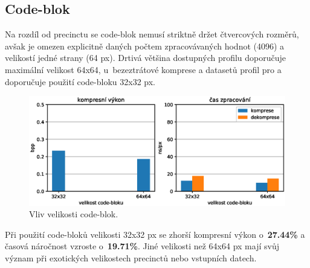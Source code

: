 \subsection*{Code-blok}
Na rozdíl od precinctu se code-blok nemusí striktně držet čtvercových rozměrů, avšak je omezen explicitně daných počtem zpracovávaných hodnot (4096) a velikostí jedné strany (64 px). Drtivá většina dostupných profilu doporučuje maximální velikost 64x64, u~bezeztrátové komprese a datasetů profil pro  a  doporučuje použití code-bloku 32x32 px. \\
\begin{figure}[hbt!]
  \centering
  \hspace*{-0.75cm}
  \includegraphics[width=16cm]{obrazky-figures/blocks/fotky_blocks.eps}
  \caption{Vliv velikosti code-blok.}
\end{figure}

\noindent Při použití code-bloků velikosti 32x32 px se zhorší kompresní výkon o~\textbf{27.44\%} a časová náročnost vzroste o~\textbf{19.71\%}. Jiné velikosti než 64x64 px mají svůj význam při exotických velikostech precinctů nebo vstupních datech.
\clearpage

%
%
\newpage
